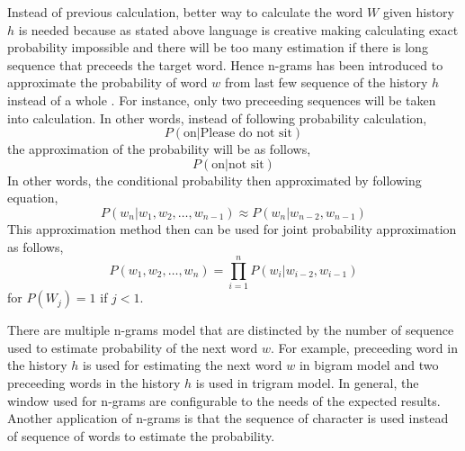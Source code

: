     Instead of previous calculation, better way to calculate the word
    $W$ given history $h$ is needed because as stated above language
    is creative making calculating exact probability impossible and
    there will be too many estimation if there is long sequence that
    preceeds the target word. Hence n-grams has been introduced to
    approximate the probability of word $w$ from last few sequence of
    the history $h$ instead of a whole
    \citep{speech2009Jurafsky:2009:SLP:1214993}. For instance, only
    two preceeding sequences will be taken into calculation.
    In other words, instead of following probability calculation,
    \begin{equation}
        P(\text{on} \vert \text{Please do not sit})
    \end{equation}
    the approximation of the probability will be as follows,
    \begin{equation}
        P(\text{on} \vert \text{not sit})
    \end{equation}
    In other words, the conditional probability then approximated by
    following equation,
    \begin{equation}
        \label{eq:condprobapprox}
        P(w_n \vert w_1, w_2, \dots, w_{n-1}) \approx P(w_n \vert w_{n-2}, w_{n-1})
    \end{equation}
    This approximation method then can be used for joint probability
    approximation as follows,
    \begin{equation}
        P(w_1, w_2, \dots, w_n) = \prod_{i=1}^n P(w_i \vert w_{i-2}, w_{i-1})
    \end{equation}
    for $P(W_j) = 1$ if $j < 1$.

    There are multiple n-grams model that are distincted by the number
    of sequence used to estimate probability of the next word $w$. For
    example, preceeding word in the history $h$ is used for estimating
    the next word $w$ in bigram model and two preceeding words in the
    history $h$ is used in trigram model. In general, the window used
    for n-grams are configurable to the needs of the expected results.
    Another application of n-grams is that the sequence of character
    is used instead of sequence of words to estimate the probability.
